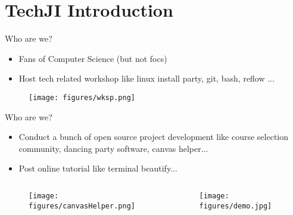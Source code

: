 \section{TechJI Introduction}
\begin{frame}[fragile]{Who are we?}
\begin{itemize}
	\item Fans of Computer Science (but not focs)
	\item Host tech related workshop like linux install party, git, bash, reflow ...
	\end{itemize}	
	\begin{figure}
		\begin{center}
			\texttt{[image: figures/wksp.png]}
		\end{center}
	\end{figure}
\end{frame}

\begin{frame}[fragile]{Who are we?}
\begin{itemize}
	\item Conduct a bunch of open source project development like course selection community, dancing party software, canvas helper...
	\item Post online tutorial like terminal beautify...
\end{itemize}

\begin{columns}
	\begin{column}{0.5\textwidth}
		\begin{figure}
			\centering
			\texttt{[image: figures/canvasHelper.png]}
		\end{figure}
	\end{column}
	\begin{column}{0.5\textwidth}
		\begin{figure}
			\centering
			\texttt{[image: figures/demo.jpg]}
		\end{figure}
	\end{column}
\end{columns}
\end{frame}
